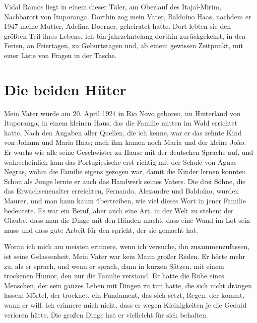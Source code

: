 \documentclass[
  ngerman,
  11pt,
  openany]{book}
\begin{document}
Vidal Ramos liegt in einem dieser Täler, am Oberlauf des Itajaí-Mirim,
Nachbarort von Ituporanga. Dorthin zog mein Vater, Baldoíno Haas,
nachdem er 1947 meine Mutter, Adelina Doerner, geheiratet hatte. Dort
lebten sie den größten Teil ihres Lebens. Ich bin jahrzehntelang dorthin
zurückgekehrt, in den Ferien, an Feiertagen, zu Geburtstagen und, ab
einem gewissen Zeitpunkt, mit einer Liste von Fragen in der Tasche.

\section{Die beiden Hüter}\label{die-beiden-huxfcter}

Mein Vater wurde am 20. April 1924 in Rio Novo geboren, im Hinterland
von Ituporanga, in einem kleinen Haus, das die Familie mitten im Wald
errichtet hatte. Nach den Angaben aller Quellen, die ich kenne, war er
das zehnte Kind von Johann und Maria Haas; nach ihm kamen noch Maria und
der kleine João. Er wuchs wie alle seine Geschwister zu Hause mit der
deutschen Sprache auf, und wahrscheinlich kam das Portugiesische erst
richtig mit der Schule von Águas Negras, wohin die Familie eigens
gezogen war, damit die Kinder lernen konnten. Schon als Junge lernte er
auch das Handwerk seines Vaters. Die drei Söhne, die das
Erwachsenenalter erreichten, Fernando, Alexandre und Baldoíno, wurden
Maurer, und man kann kaum übertreiben, wie viel dieses Wort in jener
Familie bedeutete. Es war ein Beruf, aber auch eine Art, in der Welt zu
stehen: der Glaube, dass man die Dinge mit den Händen macht, dass eine
Wand im Lot sein muss und dass gute Arbeit für den spricht, der sie
gemacht hat.

Woran ich mich am meisten erinnere, wenn ich versuche, ihn
zusammenzufassen, ist seine Gelassenheit. Mein Vater war kein Mann
großer Reden. Er hörte mehr zu, als er sprach, und wenn er sprach, dann
in kurzen Sätzen, mit einem trockenen Humor, den nur die Familie
verstand. Er hatte die Ruhe eines Menschen, der sein ganzes Leben mit
Dingen zu tun hatte, die sich nicht drängen lassen: Mörtel, der
trocknet, ein Fundament, das sich setzt, Regen, der kommt, wann er will.
Ich erinnere mich nicht, dass er wegen Kleinigkeiten je die Geduld
verloren hätte. Die großen Dinge hat er vielleicht für sich behalten.
\end{document}
